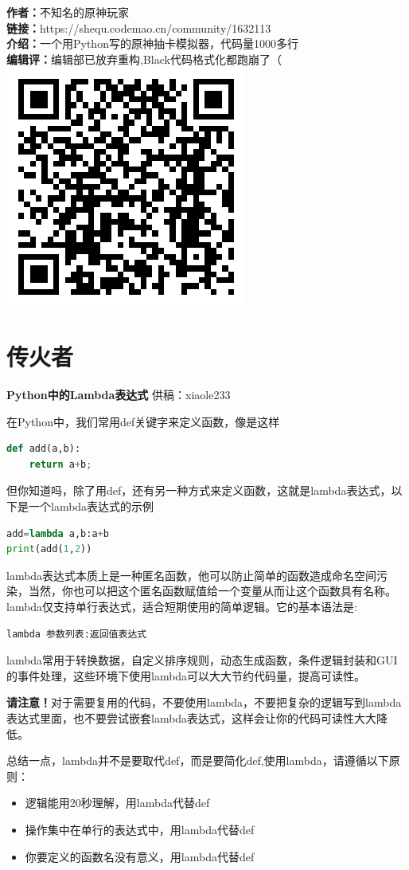 \documentclass[UTF8]{ctexart}
\begin{document}
\noindent
\textbf{作者：}不知名的原神玩家 \\
\textbf{链接：}https://shequ.codemao.cn/community/1632113 \\
\textbf{介绍：}一个用Python写的原神抽卡模拟器，代码量1000多行\footnotemark\\
\textbf{编辑评：}编辑部已放弃重构,Black代码格式化都跑崩了（
\hfill \includegraphics[width=0.08\columnwidth]{assets/02/python-2-qrc.png}
\pagebreak
\part{传火者}
\begin{center}
	\textbf{Python中的Lambda表达式}
	\normalsize
	供稿：xiaole233
\end{center}
在Python中，我们常用def关键字来定义函数，像是这样
\begin{lstlisting}[language=python]
def add(a,b):
	return a+b;
\end{lstlisting}
但你知道吗，除了用def，还有另一种方式来定义函数，这就是lambda表达式，以下是一个lambda表达式的示例
\begin{lstlisting}[language=python]
add=lambda a,b:a+b
print(add(1,2))
\end{lstlisting}
lambda表达式本质上是一种匿名函数，他可以防止简单的函数造成命名空间污染，当然，你也可以把这个匿名函数赋值给一个变量从而让这个函数具有名称。lambda仅支持单行表达式，适合短期使用的简单逻辑。它的基本语法是:
\begin{lstlisting}
lambda 参数列表:返回值表达式
\end{lstlisting}
lambda常用于转换数据，自定义排序规则，动态生成函数，条件逻辑封装和GUI的事件处理，这些环境下使用lambda可以大大节约代码量，提高可读性。

\textbf{请注意！}对于需要复用的代码，不要使用lambda，不要把复杂的逻辑写到lambda表达式里面，也不要尝试嵌套lambda表达式，这样会让你的代码可读性大大降低。

总结一点，lambda并不是要取代def，而是要简化def,使用lambda，请遵循以下原则：
\begin{itemize}
	\item 逻辑能用20秒理解，用lambda代替def
	\item 操作集中在单行的表达式中，用lambda代替def
	\item 你要定义的函数名没有意义，用lambda代替def
\end{itemize}
\pagebreak
\end{document}
